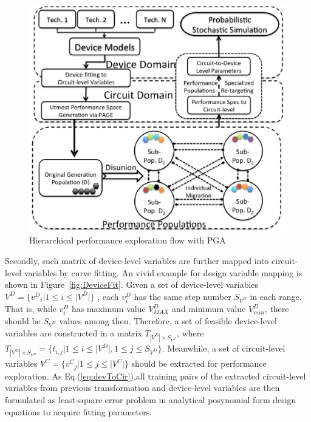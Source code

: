     \begin{figure}[t]
      \centering
      \includegraphics[width=\textwidth]{Fig/PageFlow.eps}
      \caption{Hierarchical performance exploration flow with PGA} 
      \label{fig:PageFlow}
    \end{figure}

    Secondly, such matrix of device-level variables are further mapped into circuit-level variables by curve fitting. An vivid example for design variable mapping is shown in Figure~\ref{fig:DeviceFit}. Given a set of device-level variables $V^D= \{{v^D}_i| 1 \leq i \leq |V^D|\}$ , each $v^D_i$ has the same step number $S_{V^D}$ in each range. That is, while $v_i^D$ has maximum value $V^D_{MAX}$ and minimum value $V^D_{min}$, there should be $S_{V^D}$ values among then. Therefore, a set of feasible device-level variables are constructed in a matrix $T_{|V^D|\times S_{V^D}}$, where $T_{|V^D| \times S_{V^D}} = \{ t_{i,j}| 1 \leq i \leq |V^D|, 1 \leq j \leq S_{V^D} \}$. Meanwhile, a set of circuit-level variables $V^C = \{{v^C}_j| 1 \leq j \leq |V^C|\}$ should be extracted for performance exploration. As Eq.(\ref{eq:devToCir}),all training pairs of the extracted circuit-level variables from previous transformation and device-level variables are then formulated as least-square error problem in analytical posynomial form design equations to acquire fitting parameters.

